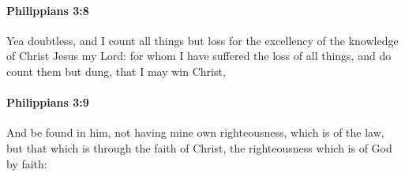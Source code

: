 		\paragraph{Philippians 3:8} %
			\label{PHILIPPIANS-3-8}

			Yea doubtless, and I count all things but loss for the excellency of the knowledge of Christ Jesus my Lord: for whom I have suffered the loss of all things, and do count them but dung, that I may win Christ,

			\begin{framed}
			\scriptsize
				\begin{compactdesc}
					\item[SBLG] 
				\end{compactdesc}
			\end{framed}

		\paragraph{Philippians 3:9} %
			\label{PHILIPPIANS-3-9}

			And be found in him, not having mine own righteousness, which is of the law, but that which is through the faith of Christ, the righteousness which is of God by faith:

